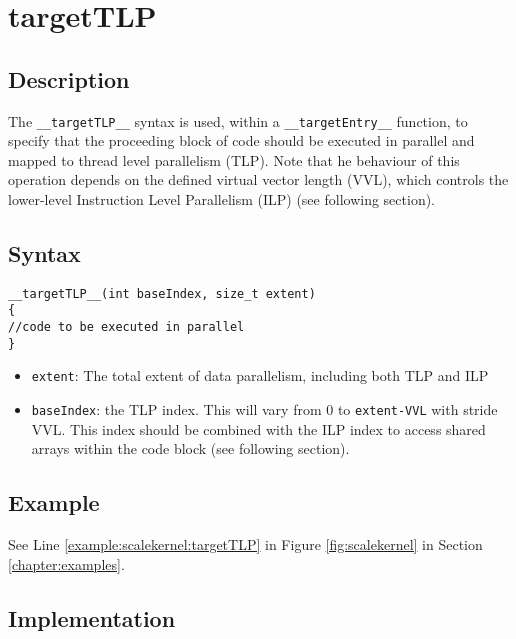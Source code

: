


\newpage
\section{targetTLP}\label{sec:TLP}

\subsection{Description}

The \verb+__targetTLP__+ syntax is used, within a \verb+__targetEntry__+
function, to specify that the proceeding block of code should be
executed in parallel and mapped to thread level parallelism
(TLP). Note that he behaviour of this operation depends on the defined
virtual vector length (VVL), which controls the lower-level
Instruction Level Parallelism (ILP) (see following section).

\subsection{Syntax}
\begin{verbatim}
__targetTLP__(int baseIndex, size_t extent) 
{
//code to be executed in parallel
}
\end{verbatim}

\begin{itemize}
\item \verb+extent+: The total extent of data parallelism, including
  both TLP and ILP
\item \verb+baseIndex+: the TLP index. This will vary from 0 to \verb+extent-VVL+ with stride VVL. This index should be combined with the ILP index to access shared arrays within the code block (see following section).

\end{itemize}


\subsection{Example}
See Line \ref{example:scalekernel:targetTLP} in Figure \ref{fig:scalekernel} in Section \ref{chapter:examples}.

\subsection{Implementation}
